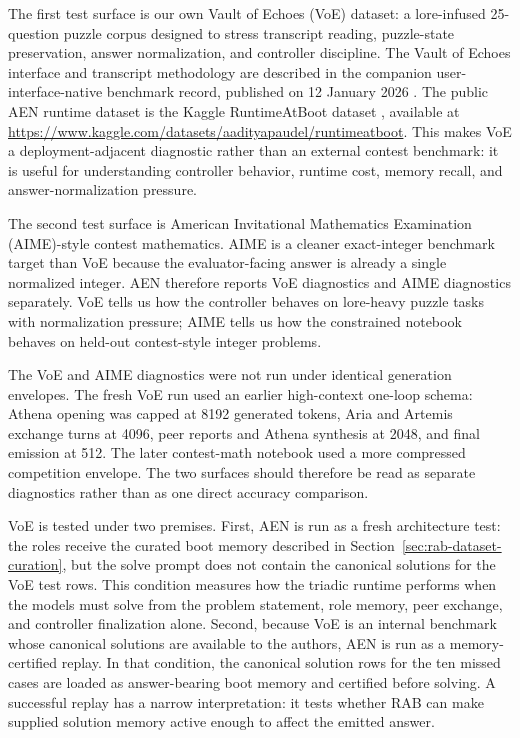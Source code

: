 \documentclass[11pt]{article}
\newcommand{\rab}{RAB}
\begin{document}
The first test surface is our own Vault of Echoes (VoE) dataset: a lore-infused 25-question puzzle corpus designed to stress transcript reading, puzzle-state preservation, answer normalization, and controller discipline. The Vault of Echoes interface and transcript methodology are described in the companion user-interface-native benchmark record, published on 12 January 2026 \citep{paudel2026uinative}. The public AEN runtime dataset is the Kaggle RuntimeAtBoot dataset \citep{paudel2026runtimeatbootdataset}, available at \url{https://www.kaggle.com/datasets/aadityapaudel/runtimeatboot}. This makes VoE a deployment-adjacent diagnostic rather than an external contest benchmark: it is useful for understanding controller behavior, runtime cost, memory recall, and answer-normalization pressure.

The second test surface is American Invitational Mathematics Examination (AIME)-style contest mathematics. AIME is a cleaner exact-integer benchmark target than VoE because the evaluator-facing answer is already a single normalized integer. AEN therefore reports VoE diagnostics and AIME diagnostics separately. VoE tells us how the controller behaves on lore-heavy puzzle tasks with normalization pressure; AIME tells us how the constrained notebook behaves on held-out contest-style integer problems.

The VoE and AIME diagnostics were not run under identical generation envelopes. The fresh VoE run used an earlier high-context one-loop schema: Athena opening was capped at 8192 generated tokens, Aria and Artemis exchange turns at 4096, peer reports and Athena synthesis at 2048, and final emission at 512. The later contest-math notebook used a more compressed competition envelope. The two surfaces should therefore be read as separate diagnostics rather than as one direct accuracy comparison.

VoE is tested under two premises. First, AEN is run as a fresh architecture test: the roles receive the curated boot memory described in Section~\ref{sec:rab-dataset-curation}, but the solve prompt does not contain the canonical solutions for the VoE test rows. This condition measures how the triadic runtime performs when the models must solve from the problem statement, role memory, peer exchange, and controller finalization alone. Second, because VoE is an internal benchmark whose canonical solutions are available to the authors, AEN is run as a memory-certified replay. In that condition, the canonical solution rows for the ten missed cases are loaded as answer-bearing boot memory and certified before solving. A successful replay has a narrow interpretation: it tests whether \rab{} can make supplied solution memory active enough to affect the emitted answer.
\end{document}
